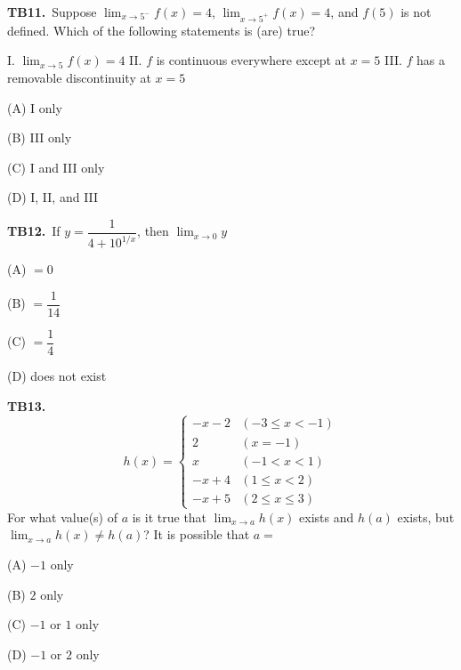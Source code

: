 \documentclass[11pt]{article}
\begin{document}
\bigskip\noindent\textbf{TB11.}\ Suppose $\displaystyle\lim_{x\to 5^-} f(x) = 4$, $\displaystyle\lim_{x\to 5^+} f(x) = 4$, and $f(5)$ is not defined. Which of the following statements is (are) true?

I. $\displaystyle\lim_{x\to 5} f(x) = 4$
II. $f$ is continuous everywhere except at $x = 5$
III. $f$ has a removable discontinuity at $x = 5$
\begin{list}{}{\setlength{\leftmargin}{3em}\setlength{\labelwidth}{2.5em}\setlength{\itemsep}{0pt}\setlength{\topsep}{2pt}}
\item[(A)] I only
\item[(B)] III only
\item[(C)] I and III only
\item[(D)] I, II, and III
\end{list}

\bigskip\noindent\textbf{TB12.}\ If $y = \dfrac{1}{4+10^{1/x}}$, then $\displaystyle\lim_{x\to 0} y$
\begin{list}{}{\setlength{\leftmargin}{3em}\setlength{\labelwidth}{2.5em}\setlength{\itemsep}{0pt}\setlength{\topsep}{2pt}}
\item[(A)] $=0$
\item[(B)] $=\dfrac{1}{14}$
\item[(C)] $=\dfrac{1}{4}$
\item[(D)] does not exist
\end{list}

\bigskip\noindent\textbf{TB13.}\ \[
h(x) = \begin{cases}
-x-2 & (-3 \leq x < -1) \\
2 & (x = -1) \\
x & (-1 < x < 1) \\
-x+4 & (1 \leq x < 2) \\
-x+5 & (2 \leq x \leq 3)
\end{cases}
\]
For what value(s) of $a$ is it true that $\displaystyle\lim_{x\to a} h(x)$ exists and $h(a)$ exists, but $\displaystyle\lim_{x\to a} h(x) \neq h(a)$? It is possible that $a =$
\begin{list}{}{\setlength{\leftmargin}{3em}\setlength{\labelwidth}{2.5em}\setlength{\itemsep}{0pt}\setlength{\topsep}{2pt}}
\item[(A)] $-1$ only
\item[(B)] $2$ only
\item[(C)] $-1$ or $1$ only
\item[(D)] $-1$ or $2$ only
\end{list}
\end{document}
